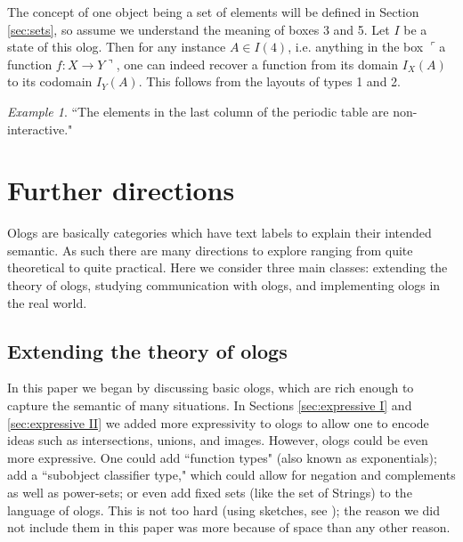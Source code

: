 \documentclass{amsart}
\def\to{\rightarrow}
\def\taking{\colon}
\newcommand{\fakebox}[1]{\tn{$\ulcorner$#1$\urcorner$}}
\theoremstyle{remark}
\newtheorem{example}[theorem]{Example}
\theoremstyle{definition}
\def\tn{\textnormal}
\begin{document}
{The concept of one object being a set of elements will be defined in Section \ref{sec:sets}, so assume we understand the meaning of boxes 3 and 5. Let $I$ be a state of this olog. Then for any instance $A\in I(4)$, i.e. anything in the box \fakebox{a function $f\taking X\to Y$}, one can indeed recover a function from its domain $I_X(A)$ to its codomain $I_Y(A)$. This follows from the layouts of types 1 and 2.

\begin{example}

``The elements in the last column of the periodic table are non-interactive."

\end{example}

}%



\section{Further directions}\label{sec:further}

Ologs are basically categories which have text labels to explain their intended semantic. As such there are many directions to explore ranging from quite theoretical to quite practical. Here we consider three main classes: extending the theory of ologs, studying communication with ologs, and implementing ologs in the real world.

\subsection{Extending the theory of ologs}

In this paper we began by discussing basic ologs, which are rich enough to capture the semantic of many situations. In Sections \ref{sec:expressive I} and \ref{sec:expressive II} we added more expressivity to ologs to allow one to encode ideas such as intersections, unions, and images. However, ologs could be even more expressive. One could add ``function types" (also known as exponentials); add a ``subobject classifier type," which could allow for negation and complements as well as power-sets; or even add fixed sets (like the set of Strings) to the language of ologs. This is not too hard (using sketches, see \cite{Mak}); the reason we did not include them in this paper was more because of space than any other reason. 
\end{document}
